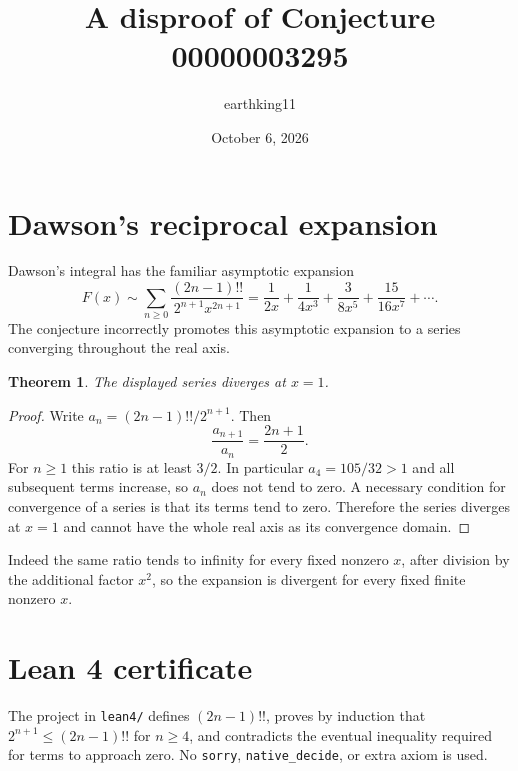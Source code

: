 \documentclass[11pt]{article}
\title{A disproof of Conjecture 00000003295}
\author{earthking11}
\date{October 6, 2026}
\newtheorem{theorem}{Theorem}
\begin{document}
\maketitle
\section*{Dawson's reciprocal expansion}
Dawson's integral has the familiar asymptotic expansion
\[
 F(x)\sim\sum_{n\ge0}\frac{(2n-1)!!}{2^{n+1}x^{2n+1}}
 =\frac1{2x}+\frac1{4x^3}+\frac3{8x^5}+\frac{15}{16x^7}+\cdots.
\]
The conjecture incorrectly promotes this asymptotic expansion to a series
converging throughout the real axis.

\begin{theorem}
The displayed series diverges at $x=1$.
\end{theorem}
\begin{proof}
Write $a_n=(2n-1)!!/2^{n+1}$.  Then
\[
 \frac{a_{n+1}}{a_n}=\frac{2n+1}{2}.
\]
For $n\ge1$ this ratio is at least $3/2$.  In particular $a_4=105/32>1$
and all subsequent terms increase, so $a_n$ does not tend to zero.  A
necessary condition for convergence of a series is that its terms tend to
zero.  Therefore the series diverges at $x=1$ and cannot have the whole real
axis as its convergence domain.
\end{proof}

Indeed the same ratio tends to infinity for every fixed nonzero $x$, after
division by the additional factor $x^2$, so the expansion is divergent for
every fixed finite nonzero $x$.

\section*{Lean 4 certificate}
The project in \texttt{lean4/} defines $(2n-1)!!$, proves by induction that
$2^{n+1}\le(2n-1)!!$ for $n\ge4$, and contradicts the eventual inequality
required for terms to approach zero.  No \texttt{sorry},
\texttt{native\_decide}, or extra axiom is used.
\end{document}
